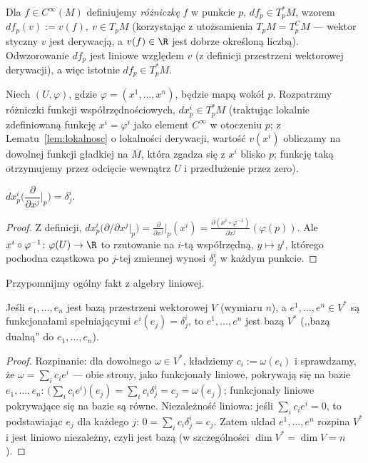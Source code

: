 Dla $f\in C^\infty(M)$ definiujemy \emph{różniczkę} $f$ w punkcie $p$, $df_p\in T_p^*M$,
wzorem $df_p(v):=v(f), \ v\in T_pM$
(korzystając z utożsamienia $T_pM=T_p^CM$ — wektor styczny $v$ jest derywacją, a $v(f)\in
\R$ jest dobrze określoną liczbą). Odwzorowanie $df_p$ jest liniowe względem $v$ (z
definicji przestrzeni wektorowej derywacji), a więc istotnie $df_p\in T_p^*M$.

Niech $(U,\varphi)$, gdzie $\varphi=(x^1,\dots,x^n)$, będzie mapą wokół $p$. Rozpatrzmy różniczki funkcji
współrzędnościowych, $dx^i_p\in T_p^*M$ (traktując lokalnie zdefiniowaną funkcję
$x^i=\varphi^i$ jako element $C^\infty$ w otoczeniu $p$; z Lematu~\ref{lem:lokalnosc} o
lokalności derywacji, wartość $v(x^i)$ obliczamy na dowolnej funkcji
gładkiej na $M$, która zgadza się z $x^i$ blisko $p$; funkcję taką
otrzymujemy przez odcięcie wewnątrz $U$ i przedłużenie przez zero).

\begin{fakt}\label{fakt:dual-baza}
$dx^i_p\Big(\dfrac{\partial}{\partial x^j}\Big|_p\Big)=\delta^i_j$.
\end{fakt}
\begin{proof}
Z definicji, $dx^i_p\big(\partial/\partial x^j|_p\big)=\frac{\partial}{\partial x^j}
\Big|_p(x^i)=\frac{\partial(x^i\circ\varphi^{-1})}{\partial x^j}(\varphi(p))$. Ale
$x^i\circ\varphi^{-1}\colon\varphi(U)\to\R$ to rzutowanie na $i$-tą współrzędną,
$y\mapsto y^i$, którego pochodna cząstkowa po $j$-tej zmiennej wynosi $\delta^i_j$ w
każdym punkcie.
\end{proof}

Przypomnijmy ogólny fakt z algebry liniowej.

\begin{fakt}\label{fakt:baza-dualna}
Jeśli $e_1,\dots,e_n$ jest bazą przestrzeni wektorowej $V$ (wymiaru $n$), a $e^1,\dots,
e^n\in V^*$ są funkcjonałami spełniającymi $e^i(e_j)=\delta^i_j$, to $e^1,\dots,e^n$ jest
bazą $V^*$ (,,bazą dualną'' do $e_1,\dots,e_n$).
\end{fakt}
\begin{proof}
Rozpinanie: dla dowolnego $\omega\in V^*$, kładziemy $c_i:=\omega(e_i)$ i sprawdzamy, że
$\omega=\sum_ic_ie^i$ — obie strony, jako funkcjonały liniowe, pokrywają się na bazie
$e_1,\dots,e_n$: $\big(\sum_ic_ie^i\big)(e_j)=\sum_ic_i\delta^i_j=c_j=\omega(e_j)$;
funkcjonały liniowe pokrywające się na bazie są równe. Niezależność liniowa: jeśli
$\sum_ic_ie^i=0$, to podstawiając $e_j$ dla każdego $j$: $0=\sum_ic_i\delta^i_j=c_j$.
Zatem układ $e^1,\dots,e^n$ rozpina $V^*$ i jest liniowo niezależny, czyli jest bazą (w
szczególności $\dim V^*=\dim V=n$).
\end{proof}

